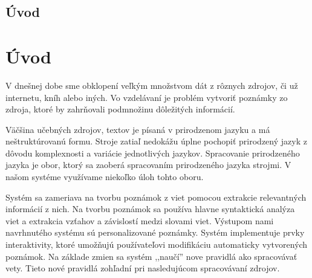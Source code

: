 \newpage
{}
{
	\section{Úvod}
}
{
	\chapter{Úvod}
}
V dnešnej dobe sme obklopení veľkým množstvom dát z rôznych zdrojov, či už internetu, kníh alebo iných. Vo vzdelávaní je problém vytvoriť poznámky zo zdroja, ktoré by zahrňovali podmnožinu dôležitých informácií. 

Väčšina učebných zdrojov, textov je písaná v prirodzenom jazyku a má neštruktúrovanú formu. Stroje zatiaľ nedokážu úplne pochopiť prirodzený jazyk z dôvodu komplexnosti a variácie jednotlivých jazykov. Spracovanie prirodzeného jazyka je obor, ktorý sa zaoberá spracovaním prirodzeného jazyka strojmi. V našom systéme využívame niekoľko úloh tohto oboru.

Systém sa zameriava na tvorbu poznámok z viet pomocou extrakcie relevantných informácií z nich. Na tvorbu poznámok sa používa hlavne syntaktická analýza viet a extrakcia vzťahov a závislostí medzi slovami viet. Výstupom nami navrhnutého systému sú personalizované poznámky. Systém implementuje prvky interaktivity, ktoré umožňujú používateľovi modifikáciu automaticky vytvorených poznámok. Na základe zmien sa systém ,,naučí'' nove pravidlá ako spracovávať vety. Tieto nové pravidlá zohľadní pri nasledujúcom spracovávaní zdrojov.

